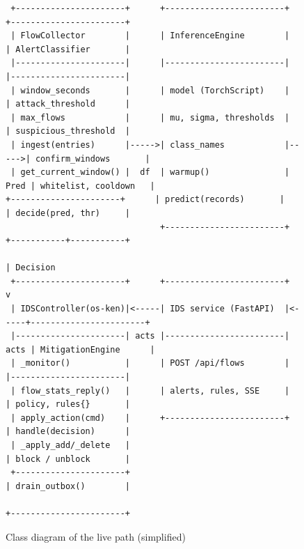 \begin{figure}[htbp]
\centering
\scriptsize
\begin{verbatim}
 +----------------------+      +------------------------+      +-----------------------+
 | FlowCollector        |      | InferenceEngine        |      | AlertClassifier       |
 |----------------------|      |------------------------|      |-----------------------|
 | window_seconds       |      | model (TorchScript)    |      | attack_threshold      |
 | max_flows            |      | mu, sigma, thresholds  |      | suspicious_threshold  |
 | ingest(entries)      |----->| class_names            |----->| confirm_windows       |
 | get_current_window() |  df  | warmup()               | Pred | whitelist, cooldown   |
+----------------------+      | predict(records)       |      | decide(pred, thr)     |
                               +------------------------+      +-----------+-----------+
                                                                           | Decision
 +----------------------+      +------------------------+                  v
 | IDSController(os-ken)|<-----| IDS service (FastAPI)  |<-----+-----------------------+
 |----------------------| acts |------------------------| acts | MitigationEngine      |
 | _monitor()           |      | POST /api/flows        |      |-----------------------|
 | flow_stats_reply()   |      | alerts, rules, SSE     |      | policy, rules{}       |
 | apply_action(cmd)    |      +------------------------+      | handle(decision)      |
 | _apply_add/_delete   |                                      | block / unblock       |
 +----------------------+                                      | drain_outbox()        |
                                                               +-----------------------+
\end{verbatim}
\caption{Class diagram of the live path (simplified)}
\label{fig:classes}
\end{figure}

